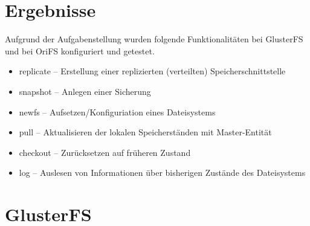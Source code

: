 
\section{Ergebnisse}
\label{sec:Ergebnisse}
Aufgrund der Aufgabenstellung wurden folgende Funktionalitäten bei GlusterFS und bei OriFS konfiguriert und getestet.
\begin{itemize}
	\item replicate – Erstellung einer replizierten (verteilten) Speicherschnittstelle
	\item snapshot – Anlegen einer Sicherung
	\item newfs – Aufsetzen/Konfiguriation eines Dateisystems
	\item pull – Aktualisieren der lokalen Speicherständen mit Master-Entität
	\item checkout – Zurücksetzen auf früheren Zustand
	\item log – Auslesen von Informationen über bisherigen Zustände des Dateisystems
\end{itemize}

\section{GlusterFS}

